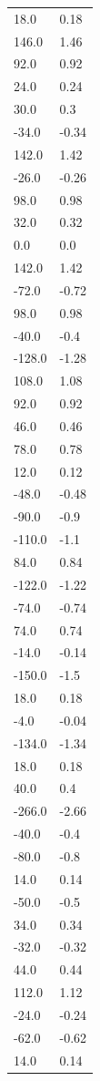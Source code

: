 \begin{longtable}{ll}
18.0 & 0.18 \\
146.0 & 1.46 \\
92.0 & 0.92 \\
24.0 & 0.24 \\
30.0 & 0.3 \\
-34.0 & -0.34 \\
142.0 & 1.42 \\
-26.0 & -0.26 \\
98.0 & 0.98 \\
32.0 & 0.32 \\
0.0 & 0.0 \\
142.0 & 1.42 \\
-72.0 & -0.72 \\
98.0 & 0.98 \\
-40.0 & -0.4 \\
-128.0 & -1.28 \\
108.0 & 1.08 \\
92.0 & 0.92 \\
46.0 & 0.46 \\
78.0 & 0.78 \\
12.0 & 0.12 \\
-48.0 & -0.48 \\
-90.0 & -0.9 \\
-110.0 & -1.1 \\
84.0 & 0.84 \\
-122.0 & -1.22 \\
-74.0 & -0.74 \\
74.0 & 0.74 \\
-14.0 & -0.14 \\
-150.0 & -1.5 \\
18.0 & 0.18 \\
-4.0 & -0.04 \\
-134.0 & -1.34 \\
18.0 & 0.18 \\
40.0 & 0.4 \\
-266.0 & -2.66 \\
-40.0 & -0.4 \\
-80.0 & -0.8 \\
14.0 & 0.14 \\
-50.0 & -0.5 \\
34.0 & 0.34 \\
-32.0 & -0.32 \\
44.0 & 0.44 \\
112.0 & 1.12 \\
-24.0 & -0.24 \\
-62.0 & -0.62 \\
14.0 & 0.14 \\

\end{longtable}

